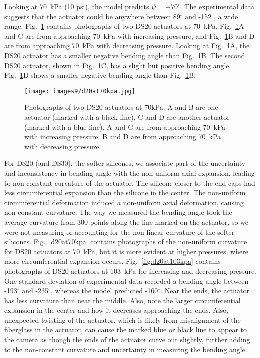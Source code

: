 Looking at 70~kPa (10 psi), the model predicts $\psi=-70^\circ$. The experimental data suggests that the actuator could be anywhere between 89$^\circ$ and -152$^\circ$, a wide range. Fig.~\ref{fig:d20at70kpa} contains photographs of two DS20 actuators at 70~kPa. Fig.~\ref{fig:d20at70kpa}A and C are from approaching 70~kPa with increasing pressure, and Fig.~\ref{fig:d20at70kpa}B and D are from approaching 70~kPa with decreasing pressure. Looking at Fig.~\ref{fig:d20at70kpa}A, the DS20 actuator has a smaller negative bending angle than Fig.~\ref{fig:d20at70kpa}B. The second DS20 actuator, shown in Fig.~\ref{fig:d20at70kpa}C, has a slight but positive bending angle. Fig.~\ref{fig:d20at70kpa}D shows a smaller negative bending angle than Fig.~\ref{fig:d20at70kpa}B. 
\\
\begin{figure}[ht]
    \centering
     \texttt{[image: images9/d20at70kpa.jpg]}
    \caption{Photographs of two DS20 actuators at 70kPa. A and B are one actuator (marked with a black line), C and D are another actuator (marked with a blue line). A and C are from approaching 70~kPa with increasing pressure. B and D are from approaching 70~kPa with decreasing pressure.}
    \label{fig:d20at70kpa}
\end{figure}

For DS20 (and DS30), the softer silicones, we associate part of the uncertainty and inconsistency in bending angle with the non-uniform axial expansion, leading to non-constant curvature of the actuator. The silicone closer to the end caps had less circumferential expansion than the silicone in the center. The non-uniform circumferential deformation induced a non-uniform axial deformation, causing non-constant curvature. The way we measured the bending angle took the average curvature from 300 points along the line marked on the actuator, so we were not measuring or accounting for the non-linear curvature of the softer silicones. Fig.~\ref{d20at70kpa} contains photographs of the non-uniform curvature for DS20 actuators at 70~kPa, but it is more evident at higher pressures, where more circumferential expansion occurs. Fig.~\ref{fig:d20at103kpa} contains photographs of DS20 actuators at 103~kPa for increasing and decreasing pressure. One standard deviation of experimental data recorded a bending angle between -193$^\circ$ and -235$^\circ$, whereas the model predicted -160$^\circ$. Near the ends, the actuator has less curvature than near the middle. Also, note the larger circumferential expansion in the center and how it decreases approaching the ends. Also, unexpected twisting of the actuator, which is likely from misalignment of the fiberglass in the actuator, can cause the marked blue or black line to appear to the camera as though the ends of the actuator curve out slightly, further adding to the non-constant curvature and uncertainty in measuring the bending angle.


